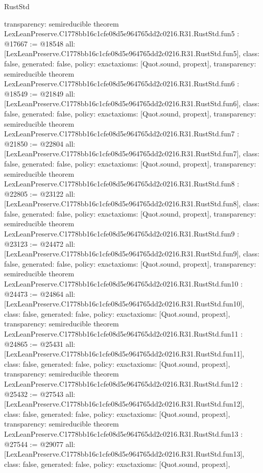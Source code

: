 \begin{lexlean}{RustStd}
\begin{coremodule}
{  transparency: semireducible
}
theorem LexLeanPreserve.C1778bb16c1cfe08d5e964765dd2c0216.R31.RustStd.fun5 : @17667 := @18548 {
  all: [LexLeanPreserve.C1778bb16c1cfe08d5e964765dd2c0216.R31.RustStd.fun5],
  class: false,
  generated: false,
  policy: exact{axioms: [Quot.sound, propext]},
  transparency: semireducible
}
theorem LexLeanPreserve.C1778bb16c1cfe08d5e964765dd2c0216.R31.RustStd.fun6 : @18549 := @21849 {
  all: [LexLeanPreserve.C1778bb16c1cfe08d5e964765dd2c0216.R31.RustStd.fun6],
  class: false,
  generated: false,
  policy: exact{axioms: [Quot.sound, propext]},
  transparency: semireducible
}
theorem LexLeanPreserve.C1778bb16c1cfe08d5e964765dd2c0216.R31.RustStd.fun7 : @21850 := @22804 {
  all: [LexLeanPreserve.C1778bb16c1cfe08d5e964765dd2c0216.R31.RustStd.fun7],
  class: false,
  generated: false,
  policy: exact{axioms: [Quot.sound, propext]},
  transparency: semireducible
}
theorem LexLeanPreserve.C1778bb16c1cfe08d5e964765dd2c0216.R31.RustStd.fun8 : @22805 := @23122 {
  all: [LexLeanPreserve.C1778bb16c1cfe08d5e964765dd2c0216.R31.RustStd.fun8],
  class: false,
  generated: false,
  policy: exact{axioms: [Quot.sound, propext]},
  transparency: semireducible
}
theorem LexLeanPreserve.C1778bb16c1cfe08d5e964765dd2c0216.R31.RustStd.fun9 : @23123 := @24472 {
  all: [LexLeanPreserve.C1778bb16c1cfe08d5e964765dd2c0216.R31.RustStd.fun9],
  class: false,
  generated: false,
  policy: exact{axioms: [Quot.sound, propext]},
  transparency: semireducible
}
theorem LexLeanPreserve.C1778bb16c1cfe08d5e964765dd2c0216.R31.RustStd.fun10 : @24473 := @24864 {
  all: [LexLeanPreserve.C1778bb16c1cfe08d5e964765dd2c0216.R31.RustStd.fun10],
  class: false,
  generated: false,
  policy: exact{axioms: [Quot.sound, propext]},
  transparency: semireducible
}
theorem LexLeanPreserve.C1778bb16c1cfe08d5e964765dd2c0216.R31.RustStd.fun11 : @24865 := @25431 {
  all: [LexLeanPreserve.C1778bb16c1cfe08d5e964765dd2c0216.R31.RustStd.fun11],
  class: false,
  generated: false,
  policy: exact{axioms: [Quot.sound, propext]},
  transparency: semireducible
}
theorem LexLeanPreserve.C1778bb16c1cfe08d5e964765dd2c0216.R31.RustStd.fun12 : @25432 := @27543 {
  all: [LexLeanPreserve.C1778bb16c1cfe08d5e964765dd2c0216.R31.RustStd.fun12],
  class: false,
  generated: false,
  policy: exact{axioms: [Quot.sound, propext]},
  transparency: semireducible
}
theorem LexLeanPreserve.C1778bb16c1cfe08d5e964765dd2c0216.R31.RustStd.fun13 : @27544 := @29077 {
  all: [LexLeanPreserve.C1778bb16c1cfe08d5e964765dd2c0216.R31.RustStd.fun13],
  class: false,
  generated: false,
  policy: exact{axioms: [Quot.sound, propext]},
}
\end{coremodule}
\end{lexlean}
